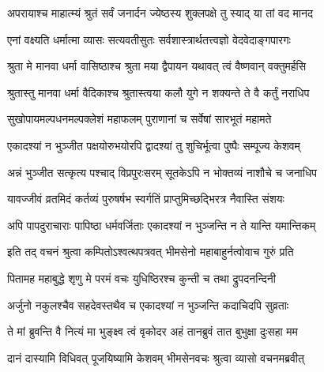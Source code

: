 \ganapatyadiDhyanam
\padmaPuranam



\twolineshloka
{अपरायाश्च माहात्म्यं श्रुतं सर्वं जनार्दन}
{ज्येष्ठस्य शुक्लपक्षे तु स्याद् या तां वद मानद}%


\twolineshloka
{एनां वक्ष्यति धर्मात्मा व्यासः सत्यवतीसुतः}
{सर्वशास्त्रार्थतत्त्वज्ञो वेदवेदाङ्गपारगः}%


\twolineshloka
{श्रुता मे मानवा धर्मा वासिष्ठाश्च श्रुता मया}
{द्वैपायन यथावत् त्वं वैष्णवान् वक्तुमर्हसि}%


\twolineshloka
{श्रुतास्तु मानवा धर्मा वैदिकाश्च श्रुतास्त्वया}
{कलौ युगे न शक्यन्ते ते वै कर्तुं नराधिप}%

\twolineshloka
{सुखोपायमल्पधनमल्पक्लेशं महाफलम्}
{पुराणानां च सर्वेषां सारभूतं महामते}%

\twolineshloka
{एकादश्यां न भुञ्जीत पक्षयोरुभयोरपि}
{द्वादश्यां तु शुचिर्भूत्वा पुष्पैः सम्पूज्य केशवम्}%

\twolineshloka
{अन्नं भुञ्जीत सत्कृत्य पश्चाद् विप्रपुरःसरम्}
{सूतकेऽपि न भोक्तव्यं नाशौचे च जनाधिप}%

\twolineshloka
{यावज्जीवं व्रतमिदं कर्तव्यं पुरुषर्षभ}
{स्वर्गतिं प्राप्तुमिच्छद्भिरत्र नैवास्ति संशयः}%

\twolineshloka
{अपि पापदुराचाराः पापिष्ठा धर्मवर्जिताः}
{एकादश्यां न भुञ्जन्ति न ते यान्ति यमान्तिकम्}%

\twolineshloka
{इति तद् वचनं श्रुत्वा कम्पितोऽश्वत्थपत्रवत्}
{भीमसेनो महाबाहुर्नत्वोवाच गुरुं प्रति}%


\twolineshloka
{पितामह महाबुद्धे शृणु मे परमं वचः}
{युधिष्ठिरश्च कुन्ती च तथा द्रुपदनन्दिनी}%

\twolineshloka
{अर्जुनो नकुलश्चैव सहदेवस्तथैव च}
{एकादश्यां न भुञ्जन्ति कदाचिदपि सुव्रताः}%

\twolineshloka
{ते मां ब्रुवन्ति वै नित्यं मा भुङ्क्ष्व त्वं वृकोदर}
{अहं तानब्रुवं तात बुभुक्षा दुःसहा मम}%

\twolineshloka
{दानं दास्यामि विधिवत् पूजयिष्यामि केशवम्}
{भीमसेनवचः श्रुत्वा व्यासो वचनमब्रवीत्}%


